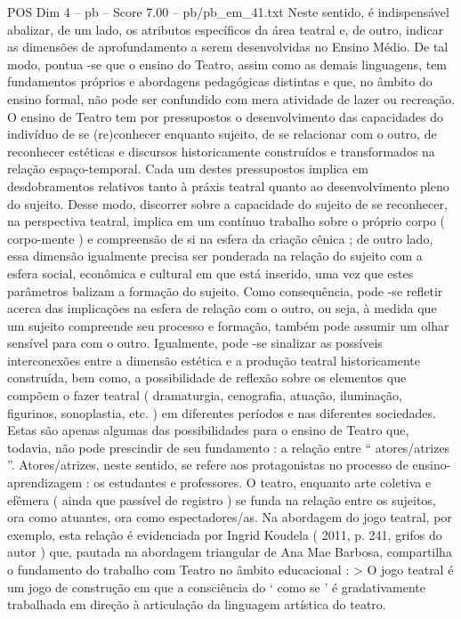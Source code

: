 \begin{textsample}{POS Dim 4 – pb – Score 7.00 – pb/pb\_em\_41.txt}
Neste sentido, é indispensável abalizar, de um lado, os atributos específicos da área teatral e, de outro, indicar as dimensões de aprofundamento a serem desenvolvidas no Ensino Médio.
De tal modo, pontua -se que o ensino do Teatro, assim como as demais linguagens, tem fundamentos próprios e abordagens pedagógicas distintas e que, no âmbito do ensino formal, não pode ser confundido com mera atividade de lazer ou recreação.
O ensino de Teatro tem por pressupostos o desenvolvimento das capacidades do indivíduo de se (re)conhecer enquanto sujeito, de se relacionar com o outro, de reconhecer estéticas e discursos historicamente construídos e transformados na relação espaço-temporal.
Cada um destes pressupostos implica em desdobramentos relativos tanto à práxis teatral quanto ao desenvolvimento pleno do sujeito.
Desse modo, discorrer sobre a capacidade do sujeito de se reconhecer, na perspectiva teatral, implica em um contínuo trabalho sobre o próprio corpo ( corpo-mente ) e compreensão de si na esfera da criação cênica ; de outro lado, essa dimensão igualmente precisa ser ponderada na relação do sujeito com a esfera social, econômica e cultural em que está inserido, uma vez que estes parâmetros balizam a formação do sujeito.
Como consequência, pode -se refletir acerca das implicações na esfera de relação com o outro, ou seja, à medida que um sujeito compreende seu processo e formação, também pode assumir um olhar sensível para com o outro.
Igualmente, pode -se sinalizar as possíveis interconexões entre a dimensão estética e a produção teatral historicamente construída, bem como, a possibilidade de reflexão sobre os elementos que compõem o fazer teatral ( dramaturgia, cenografia, atuação, iluminação, figurinos, sonoplastia, etc. ) em diferentes períodos e nas diferentes sociedades.
Estas são apenas algumas das possibilidades para o ensino de Teatro que, todavia, não pode prescindir de seu fundamento : a relação entre “ atores/atrizes ”.
Atores/atrizes, neste sentido, se refere aos protagonistas no processo de ensino-aprendizagem : os estudantes e professores.
O teatro, enquanto arte coletiva e efêmera ( ainda que passível de registro ) se funda na relação entre os sujeitos, ora como atuantes, ora como espectadores/as.
Na abordagem do jogo teatral, por exemplo, esta relação é evidenciada por Ingrid Koudela ( 2011, p. 241, grifos do autor ) que, pautada na abordagem triangular de Ana Mae Barbosa, compartilha o fundamento do trabalho com Teatro no âmbito educacional : > O jogo teatral é um jogo de construção em que a consciência do ‘ como se ’ é gradativamente trabalhada em direção à articulação da linguagem artística do teatro.

\end{textsample}

